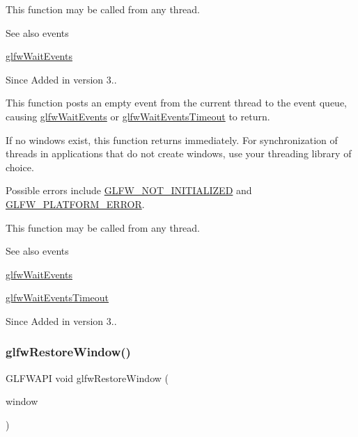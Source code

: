 This function may be called from any thread.

\begin{DoxySeeAlso}{See also}
events 

\hyperlink{group__window_ga6e042d05823c11e11c7339b81a237738}{glfw\+Wait\+Events}
\end{DoxySeeAlso}
\begin{DoxySince}{Since}
Added in version 3..
\end{DoxySince}
This function posts an empty event from the current thread to the event queue, causing \hyperlink{group__window_ga6e042d05823c11e11c7339b81a237738}{glfw\+Wait\+Events} or \hyperlink{group__window_ga05223a0a4c5e50f10f289e60398153aa}{glfw\+Wait\+Events\+Timeout} to return.

If no windows exist, this function returns immediately. For synchronization of threads in applications that do not create windows, use your threading library of choice.

Possible errors include \hyperlink{group__errors_ga2374ee02c177f12e1fa76ff3ed15e14a}{G\+L\+F\+W\+\_\+\+N\+O\+T\+\_\+\+I\+N\+I\+T\+I\+A\+L\+I\+Z\+ED} and \hyperlink{group__errors_gad44162d78100ea5e87cdd38426b8c7a1}{G\+L\+F\+W\+\_\+\+P\+L\+A\+T\+F\+O\+R\+M\+\_\+\+E\+R\+R\+OR}.

This function may be called from any thread.

\begin{DoxySeeAlso}{See also}
events 

\hyperlink{group__window_ga6e042d05823c11e11c7339b81a237738}{glfw\+Wait\+Events} 

\hyperlink{group__window_ga05223a0a4c5e50f10f289e60398153aa}{glfw\+Wait\+Events\+Timeout}
\end{DoxySeeAlso}
\begin{DoxySince}{Since}
Added in version 3.. 
\end{DoxySince}
\mbox{\label{group__window_ga1e29caf0b819f578b04db52fff17256c}} 
\subsubsection{\texorpdfstring{glfw\+Restore\+Window()}{glfwRestoreWindow()}}
{\footnotesize\ttfamily G\+L\+F\+W\+A\+PI void glfw\+Restore\+Window (\begin{DoxyParamCaption}\item[{\hyperlink{group__window_ga3c96d80d363e67d13a41b5d1821f3242}{G\+L\+F\+Wwindow} $\ast$}]{window }\end{DoxyParamCaption})}



